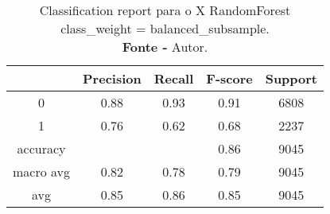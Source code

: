 % 
\begin{table}[H]
    \centering
    \begin{tabular}{@{}ccccc@{}}
    \toprule
     & \textbf{Precision} & \textbf{Recall} &\textbf{F-score} & \textbf{Support} \\ \midrule 
    0 & 0.88 & 0.93 & 0.91 & 6808 \\ 
    1 & 0.76 & 0.62 & 0.68 & 2237 \\ 
    accuracy &  &  & 0.86 & 9045 \\ 
    macro avg & 0.82 & 0.78 & 0.79 & 9045 \\ 
    avg & 0.85 & 0.86 & 0.85 & 9045 \\ \bottomrule
    \end{tabular}
    \caption{Classification report para o X RandomForest class\_weight = balanced\_subsample. \\ \textbf{Fonte -} Autor.}
    \label{tab: classification-report-X RandomForest class_weight = balanced_subsample}
\end{table}